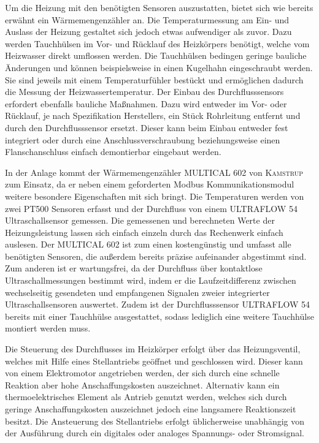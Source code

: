 Um die Heizung mit den benötigten Sensoren auszustatten, bietet sich wie bereits erwähnt ein Wärmemengenzähler an. Die Temperaturmessung am Ein- und Auslass der Heizung gestaltet sich jedoch etwas aufwendiger als zuvor. Dazu werden Tauchhülsen im Vor- und Rücklauf des Heizkörpers benötigt, welche vom Heizwasser direkt umflossen werden. Die Tauchhülsen bedingen geringe bauliche Änderungen und können beispielsweise in einen Kugelhahn eingeschraubt werden. Sie sind jeweils mit einem Temperaturfühler bestückt und ermöglichen dadurch die Messung der Heizwassertemperatur. Der Einbau des Durchflusssensors erfordert ebenfalls bauliche Maßnahmen. Dazu wird entweder im Vor- oder Rücklauf, je nach Spezifikation Herstellers, ein Stück Rohrleitung entfernt und durch den Durchflusssensor ersetzt. Dieser kann beim Einbau entweder fest integriert oder durch eine Anschlussverschraubung beziehungsweise einen Flanschanschluss einfach demontierbar eingebaut werden.

In der Anlage kommt der Wärmemengenzähler \textsc{MULTICAL 602} von \textsc{Kamstrup} zum Einsatz, da er neben einem geforderten Modbus Kommunikationsmodul weitere besondere Eigenschaften mit sich bringt. Die Temperaturen werden von zwei PT500 Sensoren erfasst und der Durchfluss von einem \textsc{ULTRAFLOW 54} Ultraschallsensor gemessen. Die gemessenen und  berechneten Werte der Heizungsleistung lassen sich einfach einzeln durch das Rechenwerk einfach auslesen.
Der \textsc{MULTICAL 602} ist zum einen kostengünstig und umfasst alle benötigten Sensoren, die außerdem bereits präzise aufeinander abgestimmt sind. Zum anderen ist er wartungsfrei, da der Durchfluss über kontaktlose Ultraschallmessungen bestimmt wird, indem er die Laufzeitdifferenz zwischen wechselseitig gesendeten und empfangenen Signalen zweier integrierter Ultraschallsensoren auswertet. Zudem ist der Durchflusssensor \textsc{ULTRAFLOW 54} bereits mit einer Tauchhülse ausgestattet, sodass lediglich eine weitere Tauchhülse montiert werden muss.


Die Steuerung des Durchflusses im Heizkörper erfolgt über das Heizungsventil, welches mit Hilfe eines Stellantriebs geöffnet und geschlossen wird. Dieser kann von einem Elektromotor angetrieben werden, der sich durch eine schnelle Reaktion aber hohe Anschaffungskosten  auszeichnet. Alternativ kann ein thermoelektrisches Element als Antrieb genutzt werden, welches sich durch geringe Anschaffungskosten auszeichnet jedoch eine langsamere Reaktionszeit besitzt. Die Ansteuerung des Stellantriebs erfolgt üblicherweise unabhängig von der Ausführung durch ein digitales oder analoges Spannungs- oder Stromsignal.


